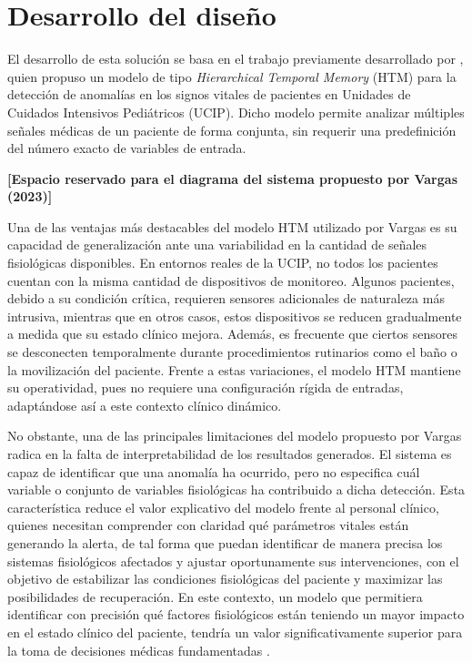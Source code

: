 \chapter{Desarrollo del diseño}

El desarrollo de esta solución se basa en el trabajo previamente desarrollado por \textcite{Vargas2023}, quien propuso un modelo de tipo \textit{Hierarchical Temporal Memory }(HTM) para la detección de anomalías en los signos vitales de pacientes en Unidades de Cuidados Intensivos Pediátricos (UCIP). Dicho modelo permite analizar múltiples señales médicas de un paciente de forma conjunta, sin requerir una predefinición del número exacto de variables de entrada.

\vspace{0.5cm}

\begin{center} \textbf{[Espacio reservado para el diagrama del sistema propuesto por Vargas (2023)]}
\end{center}

\vspace{0.5cm}

Una de las ventajas más destacables del modelo HTM utilizado por Vargas es su capacidad de generalización ante una variabilidad en la cantidad de señales fisiológicas disponibles. En entornos reales de la UCIP, no todos los pacientes cuentan con la misma cantidad de dispositivos de monitoreo. Algunos pacientes, debido a su condición crítica, requieren sensores adicionales de naturaleza más intrusiva, mientras que en otros casos, estos dispositivos se reducen gradualmente a medida que su estado clínico mejora. Además, es frecuente que ciertos sensores se desconecten temporalmente durante procedimientos rutinarios como el baño o la movilización del paciente. Frente a estas variaciones, el modelo HTM mantiene su operatividad, pues no requiere una configuración rígida de entradas, adaptándose así a este contexto clínico dinámico.

No obstante, una de las principales limitaciones del modelo propuesto por Vargas radica en la falta de interpretabilidad de los resultados generados. El sistema es capaz de identificar que una anomalía ha ocurrido, pero no especifica cuál variable o conjunto de variables fisiológicas ha contribuido a dicha detección. Esta característica reduce el valor explicativo del modelo frente al personal clínico, quienes necesitan comprender con claridad qué parámetros vitales están generando la alerta, de tal forma que puedan identificar de manera precisa los sistemas fisiológicos afectados y ajustar oportunamente sus intervenciones, con el objetivo de estabilizar las condiciones fisiológicas del paciente y maximizar las posibilidades de recuperación. En este contexto, un modelo que permitiera identificar con precisión qué factores fisiológicos están teniendo un mayor impacto en el estado clínico del paciente, tendría un valor significativamente superior para la toma de decisiones médicas fundamentadas \parencite{zhang2023interpretable}.

